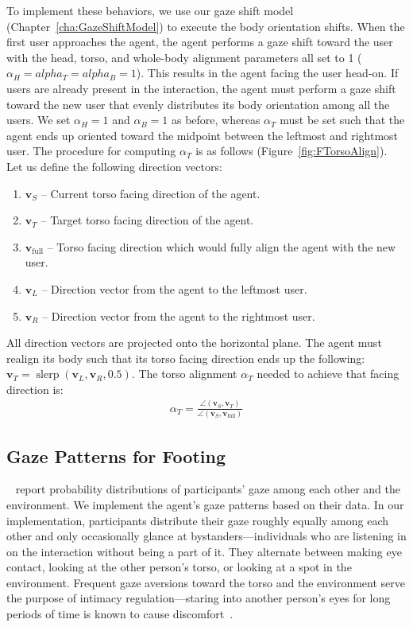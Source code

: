 To implement these behaviors, we use our gaze shift model (Chapter~\ref{cha:GazeShiftModel}) to execute the body orientation shifts. When the first user approaches the agent, the agent performs a gaze shift toward the user with the head, torso, and whole-body alignment parameters all set to 1 ($\alpha_H = alpha_T = alpha_B = 1$). This results in the agent facing the user head-on. If users are already present in the interaction, the agent must perform a gaze shift toward the new user that evenly distributes its body orientation among all the users. We set $\alpha_H = 1$ and $\alpha_B = 1$ as before, whereas $\alpha_T$ must be set such that the agent ends up oriented toward the midpoint between the leftmost and rightmost user. The procedure for computing $\alpha_T$ is as follows (Figure~\ref{fig:FTorsoAlign}). Let us define the following direction vectors:

\begin{enumerate}
\item $\mathbf{v}_S$ -- Current torso facing direction of the agent.
\item $\mathbf{v}_T$ -- Target torso facing direction of the agent.
\item $\mathbf{v}_\mathrm{full}$ -- Torso facing direction which would fully align the agent with the new user.
\item $\mathbf{v}_L$ -- Direction vector from the agent to the leftmost user.
\item $\mathbf{v}_R$ -- Direction vector from the agent to the rightmost user.
\end{enumerate}

All direction vectors are projected onto the horizontal plane. The agent must realign its body such that its torso facing direction ends up the following: $\mathbf{v}_T = \mathop{slerp}(\mathbf{v}_L, \mathbf{v}_R, 0.5)$. The torso alignment $\alpha_T$ needed to achieve that facing direction is:
%
\begin{align} \label{eq:FTorsoAlign}
\alpha_T = \frac{\angle(\mathbf{v}_S, \mathbf{v}_T)}{\angle(\mathbf{v}_S, \mathbf{v}_\mathrm{full})}
\end{align}
%

\subsection{Gaze Patterns for Footing}

~\citet{mutlu2012conversational} report probability distributions of participants' gaze among each other and the environment. We implement the agent's gaze patterns based on their data. In our implementation, participants distribute their gaze roughly equally among each other and only occasionally glance at bystanders---individuals who are listening in on the interaction without being a part of it. They alternate between making eye contact, looking at the other person's torso, or looking at a spot in the environment. Frequent gaze aversions toward the torso and the environment serve the purpose of intimacy regulation---staring into another person's eyes for long periods of time is known to cause discomfort~\citep{argyle1976gaze}.

